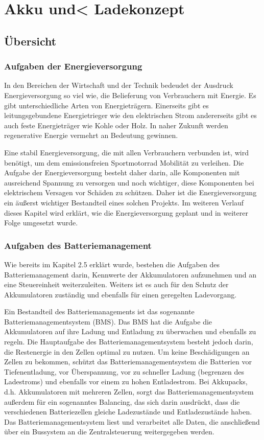 \chapter{Akku und< Ladekonzept}

\section{Übersicht}


\subsection{Aufgaben der Energieversorgung}
In den Bereichen der Wirtschaft und der Technik bedeudet der Ausdruck Energieversorgung so viel wie, die Belieferung von Verbrauchern mit Energie. Es gibt unterschiedliche Arten von Energieträgern. Einerseits gibt es leitungsgebundene Energietrieger wie den elektrischen Strom andererseits gibt es auch feste Energieträger wie Kohle oder Holz. In naher Zukunft werden regenerative Energie vermehrt an Bedeutung gewinnen.

Eine stabil Energieversorgung, die mit allen Verbrauchern verbunden ist, wird benötigt, um dem emissionsfreien Sportmotorrad Mobilität zu verleihen. Die Aufgabe der Energieversorgung besteht daher darin, alle Komponenten mit ausreichend Spannung zu versorgen und noch wichtiger, diese Komponenten bei elektrischem Versagen vor Schäden zu schützen. Daher ist die Energieversorgung ein äußerst wichtiger Bestandteil eines solchen Projekts. Im weiteren Verlauf dieses Kapitel wird erklärt, wie die Energieversorgung geplant und in weiterer Folge umgesetzt wurde.

\subsection{Aufgaben des Batteriemanagement}
Wie bereits im Kapitel 2.5 erklärt wurde, bestehen die Aufgaben des Batteriemanagement darin, Kennwerte der Akkumulatoren aufzunehmen und an eine Steuereinheit weiterzuleiten. Weiters ist es auch für den Schutz der Akkumulatoren zuständig und ebenfalls für einen geregelten Ladevorgang.

Ein Bestandteil des Batteriemanagements ist das sogenannte Batteriemanagementsystem (BMS). Das BMS hat die Aufgabe die Akkumulatoren auf ihre Ladung und Entladung zu überwachen und ebenfalls zu regeln. Die Hauptaufgabe des Batteriemanagementsystem besteht jedoch darin, die Restenergie in den Zellen optimal zu nutzen. Um keine Beschädigungen an Zellen zu bekommen, schützt das Batteriemanagementsystem die Batterien vor Tiefenentladung, vor Überspannung, vor zu schneller Ladung (begrenzen des Ladestroms) und ebenfalls vor einem zu hohen Entladestrom. Bei Akkupacks, d.h. Akkumulatoren mit mehreren Zellen, sorgt das Batteriemanagementsystem außerdem für ein sogenanntes Balancing, das sich darin ausdrückt, dass die verschiedenen Batteriezellen gleiche Ladezustände und Entladezustände haben. Das Batteriemanagementsystem liest und verarbeitet alle Daten, die anschließend über ein Bussystem an die Zentralsteuerung weitergegeben werden.

